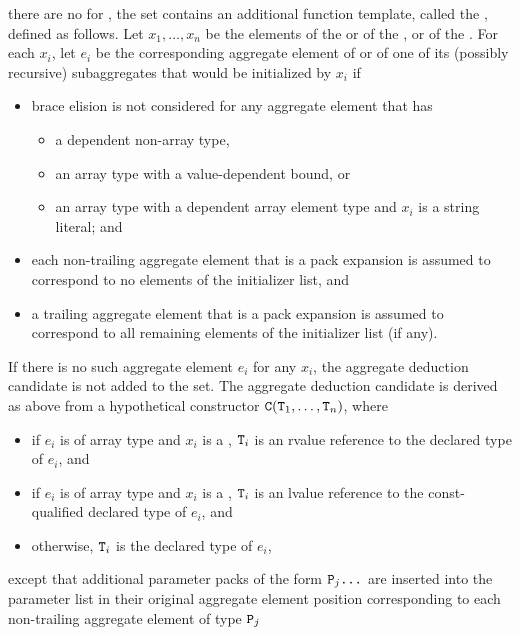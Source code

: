 there are no  for ,
the set contains an additional function template,
called the , defined as follows.
Let $x_1, \dotsc, x_n$ be the elements
of the  or
of the , or
of the .
For each $x_i$, let $e_i$ be the corresponding aggregate element
of  or of one of its (possibly recursive) subaggregates
that would be initialized by $x_i$ if
\begin{itemize}
\item
brace elision is not considered for any aggregate element
that has
\begin{itemize}
\item a dependent non-array type,
\item an array type with a value-dependent bound, or
\item an array type with a dependent array element type and $x_i$ is a string literal; and
\end{itemize}
\item
each non-trailing aggregate element that is a pack expansion
is assumed to correspond to no elements of the initializer list, and
\item
a trailing aggregate element that is a pack expansion is assumed to correspond
to all remaining elements of the initializer list (if any).
\end{itemize}
If there is no such aggregate element $e_i$ for any $x_i$,
the aggregate deduction candidate is not added to the set.
The aggregate deduction candidate is derived as above
from a hypothetical constructor $\texttt{\protect C}(\texttt{\protect T}_1, \dotsc, \texttt{\protect T}_n)$,
where
\begin{itemize}
\item
if $e_i$ is of array type and
$x_i$ is a ,
$\texttt{\protect T}_i$ is an rvalue reference to the declared type of $e_i$, and
\item
if $e_i$ is of array type and
$x_i$ is a ,
$\texttt{\protect T}_i$ is an lvalue reference to
the const-qualified declared type of $e_i$, and
\item
otherwise, $\texttt{\protect T}_i$ is the declared type of $e_i$,
\end{itemize}
except that additional parameter packs of the form $\texttt{\protect P}_j \texttt{\protect...}$
are inserted into the parameter list in their original aggregate element position corresponding to each non-trailing aggregate element of type $\texttt{\protect P}_j$
